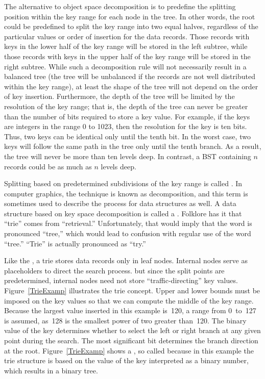 The alternative to object space decomposition is to predefine the
splitting position within the key range for each node in the tree.
In other words, the root could be predefined to split the
key range into two equal halves, regardless of the particular values
or order of insertion for the data records.
Those records with keys in the lower half of the
key range will be stored in the left subtree, while those records
with keys in the upper half of the key range will be stored in the
right subtree.
While such a decomposition rule will not necessarily result in a
balanced tree (the tree will be unbalanced if the records are not
well distributed within the key range), at least the shape of the tree
will not depend on the order of key insertion.
Furthermore, the depth of the tree will be limited by the resolution
of the key range; that is, the depth of the tree can never be greater
than the number of bits required to store a key value.
For example, if the keys are integers in the range 0 to
1023, then the resolution for the key is ten bits.
Thus, two keys can be identical only until the tenth bit.
In the worst case, two keys will follow the same path
in the tree only until the tenth branch.
As a result, the tree will never be more than ten levels deep.
In contrast, a BST containing \(n\) records could be as much as
\(n\) levels deep.

Splitting based on predetermined subdivisions of the key range is
called .
In computer graphics, the technique is known
as
 decomposition,
and this term is sometimes used to describe the process for data
structures as well.
A data structure based on key space decomposition is called
a .
Folklore has it that ``trie'' comes from ``retrieval.''
Unfortunately, that would imply that the word is pronounced ``tree,''
which would lead to confusion with regular use of the word ``tree.''
``Trie'' is actually pronounced as ``try.''

Like the \BPtree,
a trie stores data records only in leaf nodes.
Internal nodes serve as placeholders to direct the search process.
but since the split points are predetermined, internal nodes need not
store ``traffic-directing'' key values.
Figure~\ref{TrieExamp} illustrates the trie concept.
Upper and lower bounds must be imposed on the key values
so that we can compute the middle of the key range.
Because the largest value inserted in this example is~120, a range from
0~to~127 is assumed, as~128 is the smallest power of two
greater than~120.
The binary value of the key determines whether to select the left or
right branch at any given point during the search.
The most significant bit determines the branch direction at the root.
Figure~\ref{TrieExamp} shows a , so called because
in this example the trie structure is based on the value of the key
interpreted as a binary number, which results in a binary
tree.

